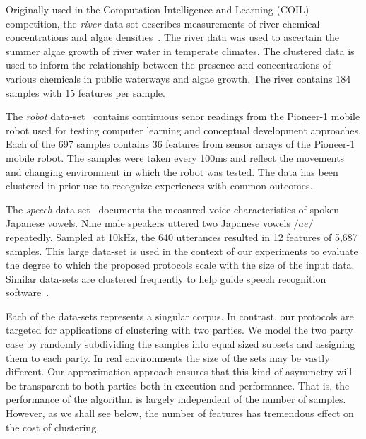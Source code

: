 Originally used in the Computation Intelligence and Learning
(COIL) competition, the {\it river} data-set describes 
measurements of river chemical concentrations and algae
densities~\cite{coil99}.  The river data was used to ascertain the
summer algae growth of river water in temperate climates.  The
clustered data is used to inform the relationship between the presence
and concentrations of various chemicals in public waterways and algae
growth.  The river contains 184 samples with 15 features per sample.

The {\it robot} data-set~\cite{pion98} contains continuous senor
readings from the Pioneer-1 mobile robot used for testing computer
learning and conceptual development approaches.  Each of the 697
samples contains 36 features from sensor arrays of the Pioneer-1
mobile robot.  The samples were taken every 100ms and reflect the
movements and changing environment in which the robot was tested.  The
data has been clustered in prior use to recognize experiences with
common outcomes.

The {\it speech} data-set~\cite{jvow00} documents the measured voice
characteristics of spoken Japanese vowels.  Nine male speakers uttered
two Japanese vowels $/ae/$ repeatedly.  Sampled at 10kHz, the 640
utterances resulted in 12 features of 5,687 samples.  This large
data-set is used in the context of our experiments to evaluate the
degree to which the proposed protocols scale with the size of the
input data.  Similar data-sets are clustered frequently to help guide
speech recognition software~\cite{kts99}.

Each of the data-sets represents a singular corpus.  In contrast, our
protocols are targeted for applications of clustering with two
parties.  We model the two party case by randomly subdividing the
samples into equal sized subsets and assigning them to each party.  In
real environments the size of the sets may be vastly different.
Our approximation approach ensures that this kind of asymmetry will be
transparent to both parties both in execution and performance.  That
is, the performance of the algorithm is largely independent of the
number of samples.  However, as we shall see below, the number
of features has tremendous effect on the cost of clustering.


